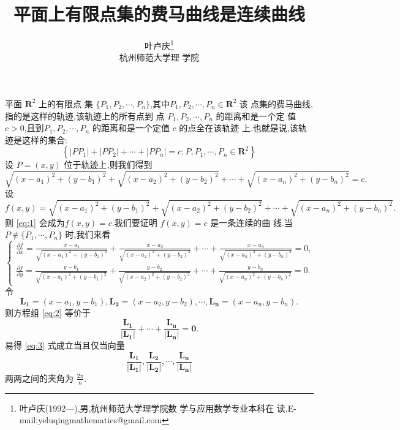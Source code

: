 \documentclass[a4paper]{article}
\begin{document}
\title{\huge{\bf{平面上有限点集的费马曲线是连续曲线}}}
\author{\small{叶卢庆\footnote{叶卢庆(1992---),男,杭州师范大学理学院数
      学与应用数学专业本科在
      读,E-mail:yeluqingmathematics@gmail.com}}\\{\small{杭州师范大学理
      学院}}}
\maketitle
平面 $\mathbf{R}^2$ 上的有限点
集 $\{P_1,P_2,\cdots,P_n\}$,其中$P_1,P_2,\cdots,P_n\in \mathbf{R}^2$.该
点集的费马曲线,指的是这样的轨迹,该轨迹上的所有点到
点 $P_1,P_2,\cdots,P_n$ 的距离和是一个定
值 $c>0$,且到$P_1,P_2,\cdots,P_n$ 的距离和是一个定值 $c$ 的点全在该轨迹
上.也就是说,该轨迹是这样的集合:
$$
\left\{ |PP_1|+|PP_2|+\cdots+|PP_n|=c:P,P_1,\cdots,P_n\in
  \mathbf{R}^2\right\}
$$
设 $P=(x,y)$ 位于轨迹上,则我们得到
\begin{equation}\label{eq:1}
\sqrt{(x-a_1)^2+(y-b_1)^2}+\sqrt{(x-a_2)^2+(y-b_2)^2}+\cdots+\sqrt{(x-a_n)^2+(y-b_n)^2}=c.
\end{equation}
设
$$
f(x,y)=\sqrt{(x-a_1)^2+(y-b_1)^2}+\sqrt{(x-a_2)^2+(y-b_2)^2}+\cdots+\sqrt{(x-a_n)^2+(y-b_n)^2}.
$$
则 \eqref{eq:1} 会成为$f(x,y)=c$.我们要证明 $f(x,y)=c$ 是一条连续的曲
线.当 $P\not\in \{P_1,\cdots,P_n\}$ 时,我们来看
\begin{equation}
  \label{eq:2}
  \begin{cases}\displaystyle
    \frac{\partial f}{\partial
      x}=\frac{x-a_1}{\sqrt{(x-a_1)^2+(y-b_1)^2}}+\frac{x-a_2}{\sqrt{(x-a_2)^2+(y-b_2)^2}}+\cdots+\frac{x-a_n}{\sqrt{(x-a_n)^2+(y-b_n)^2}}=0,\\
   \displaystyle \frac{\partial f}{\partial
     y}=\frac{y-b_1}{\sqrt{(x-a_1)^2+(y-b_1)^2}}+\frac{y-b_2}{\sqrt{(x-a_2)^2+(y-b_2)^2}}+\cdots+\frac{y-b_n}{\sqrt{(x-a_n)^2+(y-b_n)^2}}=0.
  \end{cases}
\end{equation}
令
$$
\mathbf{L_1}=(x-a_1,y-b_1),\mathbf{L_2}=(x-a_2,y-b_2),\cdots,\mathbf{L_n}=(x-a_n,y-b_n).
$$
则方程组 \eqref{eq:2} 等价于
\begin{equation}\label{eq:3}
\frac{\mathbf{L_1}}{|\mathbf{L_1}|}+\cdots+\frac{\mathbf{L_n}}{|\mathbf{L_n}|}=\mathbf{0}.
\end{equation}
易得 \eqref{eq:3} 式成立当且仅当向量
$$
\frac{\mathbf{L_1}}{|\mathbf{L_1}|},\frac{\mathbf{L_2}}{|\mathbf{L_2}|},\cdots,\frac{\mathbf{L_n}}{|\mathbf{L_n}|}
$$
两两之间的夹角为 $\frac{2\pi}{n}$.
\end{document}
